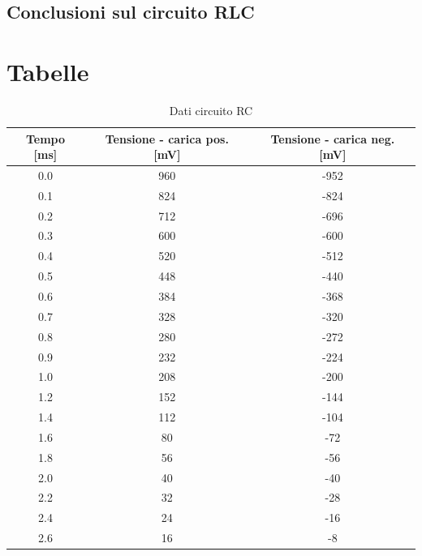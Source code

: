\documentclass[letterpaper,12pt]{article}
\begin{document}
\subsection{Conclusioni sul circuito RLC}



\section{Tabelle}

\begin{table}[htbp]
    \centering
    \caption{Dati circuito RC}
    \begin{tabular}{ccc}
        \toprule
        Tempo [ms] & Tensione - carica pos. [mV] & Tensione - carica neg. [mV]\\
        \midrule
        0.0 & 960 & -952 \\
        0.1 & 824 & -824 \\
        0.2 & 712 & -696 \\
        0.3 & 600 & -600 \\
        0.4 & 520 & -512 \\
        0.5 & 448 & -440 \\
        0.6 & 384 & -368 \\
        0.7 & 328 & -320 \\
        0.8 & 280 & -272 \\
        0.9 & 232 & -224 \\
        1.0 & 208 & -200 \\
        1.2 & 152 & -144 \\
        1.4 & 112 & -104 \\
        1.6 & 80 & -72 \\
        1.8 & 56 & -56 \\
        2.0 & 40 & -40 \\
        2.2 & 32 & -28 \\
        2.4 & 24 & -16 \\
        2.6 & 16 & -8 \\
        \bottomrule
    \end{tabular}
    \label{tab:dati_RC}
\end{table}
\end{document}
